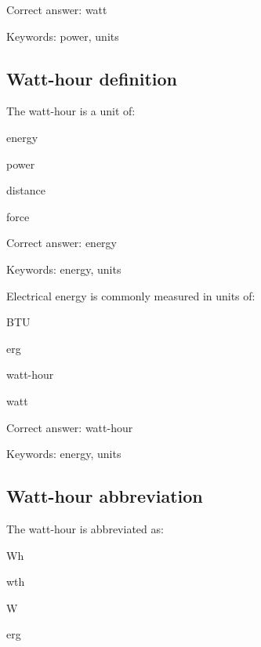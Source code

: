 Correct answer: watt

Keywords: power, units

\subsection{Watt-hour definition}

\begin{question}
	\item The watt-hour is a unit of:
\end{question}

\begin{answer}
	\item energy
	\item power
	\item distance
	\item force
\end{answer}

Correct answer: energy

Keywords: energy, units

\begin{question}
	\item Electrical energy is commonly measured in units of:
\end{question}

\begin{answer}
	\item BTU
	\item erg
	\item watt-hour
	\item watt
\end{answer}

Correct answer: watt-hour

Keywords: energy, units

\subsection{Watt-hour abbreviation}

\begin{question}
	\item The watt-hour is abbreviated as:
\end{question}

\begin{answer}
	\item Wh
	\item wth
	\item W
	\item erg
\end{answer}

